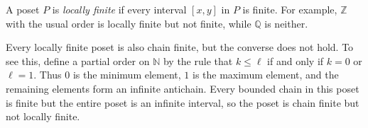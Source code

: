 \documentclass[12pt]{article}
\begin{document}
A poset $P$ is \emph{locally finite} if every interval $[x,y]$ in $P$ is finite.  For example, $\mathbb{Z}$ with the usual order is locally finite but not finite, while $\mathbb{Q}$ is neither.

Every locally finite poset is also chain finite, but the converse does not hold.  To see this, define a partial order on $\mathbb{N}$ by the rule that
$k \le \ell$ if and only if $k=0$ or $\ell=1$.  Thus $0$ is the minimum element, $1$ is the maximum element, and the remaining elements form an infinite antichain.  Every bounded chain in this poset is finite but the entire poset is an infinite interval, so the poset is chain finite but not locally finite.

\end{document}
